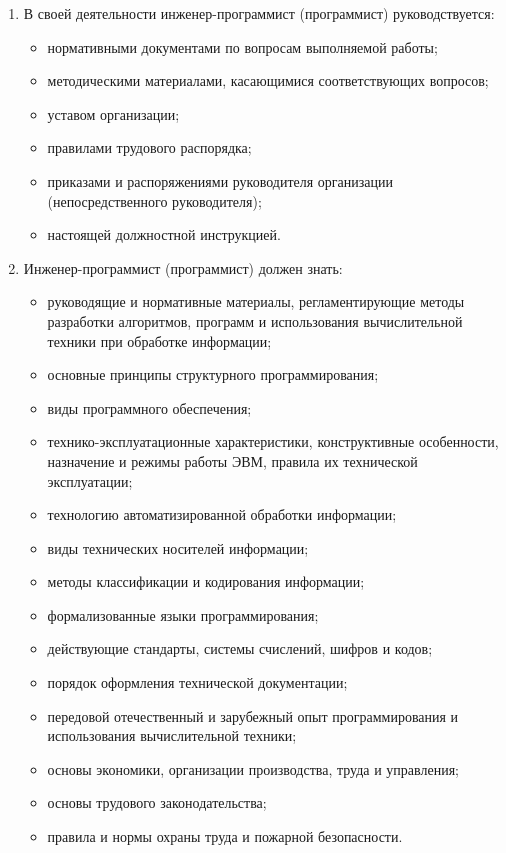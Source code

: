 \documentclass[a4paper,draft]{report}
\begin{document}
\begin{enumerate}
\begin{enumerate}
              \item В своей деятельности инженер-программист (программист) руководствуется:
                    \begin{itemize}
                        \item нормативными документами по вопросам выполняемой работы;
                        \item методическими материалами, касающимися соответствующих вопросов;
                        \item уставом организации;
                        \item правилами трудового распорядка;
                        \item приказами и распоряжениями руководителя организации (непосредственного руководителя);
                        \item настоящей должностной инструкцией.
                    \end{itemize}

              \item Инженер-программист (программист) должен знать:
                    \begin{itemize}
                        \item руководящие и нормативные материалы, регламентирующие методы разработки алгоритмов, программ и использования вычислительной техники при обработке информации;
                        \item основные принципы структурного программирования;
                        \item виды программного обеспечения;
                        \item технико-эксплуатационные характеристики, конструктивные особенности, назначение и режимы работы ЭВМ, правила их технической эксплуатации;
                        \item технологию автоматизированной обработки информации;
                        \item виды технических носителей информации;
                        \item методы классификации и кодирования информации;
                        \item формализованные языки программирования;
                        \item действующие стандарты, системы счислений, шифров и кодов;
                        \item порядок оформления технической документации;
                        \item передовой отечественный и зарубежный опыт программирования и использования вычислительной техники;
                        \item основы экономики, организации производства, труда и управления;
                        \item основы трудового законодательства;
                        \item правила и нормы охраны труда и пожарной безопасности.
                    \end{itemize}


\end{enumerate}
\end{enumerate}
\end{document}
